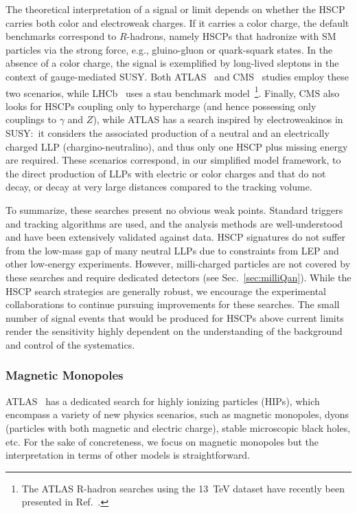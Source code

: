 {The theoretical interpretation of a signal or limit depends on whether the HSCP carries both color and electroweak charges. If it carries a color charge, the default benchmarks correspond to $R$-hadrons, namely HSCPs that hadronize with SM particles via the strong force, e.g., gluino-gluon or quark-squark states. In the absence of a color charge, the signal is exemplified by long-lived sleptons in the context of gauge-mediated SUSY. Both ATLAS~\cite{ATLAS:2014fka} and CMS~\cite{CMS:2016ybj} studies employ these two scenarios, while LHCb~\cite{Aaij:2015ica} uses a stau benchmark model~\footnote{The ATLAS R-hadron searches using the 13~TeV dataset have recently been presented in Ref.~\cite{Aaboud:2016uth}. }.
Finally, CMS also looks for HSCPs coupling only to hypercharge (and hence possessing only couplings to $\gamma$ and $Z$), while ATLAS has a search inspired by electroweakinos in SUSY:~it considers the associated production of a neutral and an electrically charged LLP (chargino-neutralino), and thus only one HSCP plus missing energy are required. These scenarios correspond, in our simplified model framework, to the direct production of LLPs with electric or color charges and that do not decay, or decay at very large distances compared to the tracking volume.

To summarize, these searches present no obvious weak points. Standard triggers and tracking algorithms are used, and the analysis methods are well-understood and have been extensively validated against data. HSCP signatures do not suffer from the low-mass gap of many neutral LLPs due to constraints from LEP and other low-energy experiments. However, milli-charged particles are not covered by these searches and require dedicated detectors (see Sec.~\ref{sec:milliQan}). While the HSCP search strategies are generally robust, we encourage the experimental collaborations to continue pursuing improvements for these searches. The small number of signal events that would be produced for HSCPs above current limits render the sensitivity highly dependent on the understanding of the background and control of the systematics.

\subsubsection*{Magnetic Monopoles}

ATLAS~\cite{Aad:2015kta} has a dedicated search for highly ionizing particles (HIPs), which encompass a variety of new physics scenarios, such as magnetic monopoles, dyons (particles with both magnetic and electric charge), stable microscopic black holes, etc. For the sake of concreteness, we focus on magnetic monopoles but the interpretation in terms of other models is straightforward.

}

